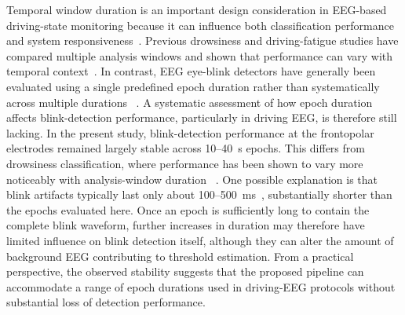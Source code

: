 
Temporal window duration is an important design consideration in EEG-based driving-state monitoring because it can influence both classification performance and system responsiveness~\citep{rashid2021random}. Previous drowsiness and driving-fatigue studies have compared multiple analysis windows and shown that performance can vary with temporal context~\citep{lee2023lstm,rashid2021random}.
In contrast, EEG eye-blink detectors have generally been evaluated using a single predefined epoch duration rather than systematically across multiple durations ~\citep{chang2016detection,wang2025sliding,shahbakhti2021vme}.
A systematic assessment of how epoch duration affects blink-detection performance, particularly in driving EEG, is therefore still lacking.
In the present study, blink-detection performance at the frontopolar electrodes remained largely stable across 10--40~s epochs.
This differs from drowsiness classification, where performance has been shown to vary more noticeably with analysis-window duration
~\citep{lee2023lstm}. One possible explanation is that blink artifacts typically last only about 100--500~ms~\citep{chang2016detection}, substantially shorter than the epochs evaluated here. Once an epoch is sufficiently long to contain the complete blink waveform, further increases in duration may therefore have limited influence on blink detection itself, although they can alter the amount of background EEG contributing to threshold estimation. From a practical perspective, the observed stability suggests that the proposed pipeline can accommodate a range of epoch durations used in driving-EEG protocols without substantial loss of detection performance.
